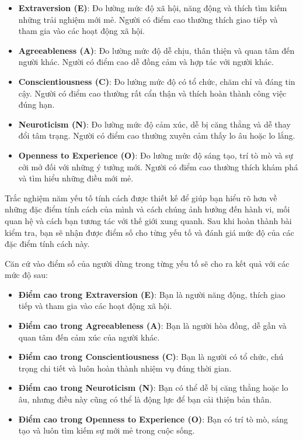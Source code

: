 \begin{itemize}
    \item \textbf{Extraversion (E)}: Đo lường mức độ xã hội, năng động và thích tìm kiếm những trải nghiệm mới mẻ. Người có điểm cao thường thích giao tiếp và tham gia vào các hoạt động xã hội.
    \item \textbf{Agreeableness (A)}: Đo lường mức độ dễ chịu, thân thiện và quan tâm đến người khác. Người có điểm cao dễ đồng cảm và hợp tác với người khác.
    \item \textbf{Conscientiousness (C)}: Đo lường mức độ có tổ chức, chăm chỉ và đáng tin cậy. Người có điểm cao thường rất cẩn thận và thích hoàn thành công việc đúng hạn.
    \item \textbf{Neuroticism (N)}: Đo lường mức độ cảm xúc, dễ bị căng thẳng và dễ thay đổi tâm trạng. Người có điểm cao thường xuyên cảm thấy lo âu hoặc lo lắng.
    \item \textbf{Openness to Experience (O)}: Đo lường mức độ sáng tạo, trí tò mò và sự cởi mở đối với những ý tưởng mới. Người có điểm cao thường thích khám phá và tìm hiểu những điều mới mẻ.
\end{itemize}

Trắc nghiệm năm yếu tố tính cách được thiết kế để giúp bạn hiểu rõ hơn về những đặc điểm tính cách của mình và cách chúng ảnh hưởng đến hành vi, mối quan hệ và cách bạn tương tác với thế giới xung quanh. Sau khi hoàn thành bài kiểm tra, bạn sẽ nhận được điểm số cho từng yếu tố và đánh giá mức độ của các đặc điểm tính cách này.

Căn cứ vào điểm số của người dùng trong từng yếu tố sẽ cho ra kết quả với các mức độ sau:
\begin{itemize}
    \item \textbf{Điểm cao trong Extraversion (E)}: Bạn là người năng động, thích giao tiếp và tham gia vào các hoạt động xã hội.
    \item \textbf{Điểm cao trong Agreeableness (A)}: Bạn là người hòa đồng, dễ gần và quan tâm đến cảm xúc của người khác.
    \item \textbf{Điểm cao trong Conscientiousness (C)}: Bạn là người có tổ chức, chú trọng chi tiết và luôn hoàn thành nhiệm vụ đúng thời gian.
    \item \textbf{Điểm cao trong Neuroticism (N)}: Bạn có thể dễ bị căng thẳng hoặc lo âu, nhưng điều này cũng có thể là động lực để bạn cải thiện bản thân.
    \item \textbf{Điểm cao trong Openness to Experience (O)}: Bạn có trí tò mò, sáng tạo và luôn tìm kiếm sự mới mẻ trong cuộc sống.
\end{itemize}

